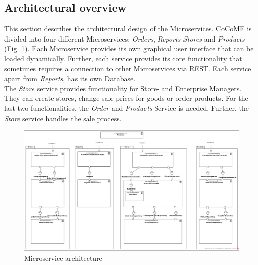 	\FloatBarrier
	\subsection{Architectural overview}	\label{archiOverviewMicro}	
	This section describes the architectural design of the Microservices. CoCoME is divided into four different Microservices: \textit{Orders}, \textit{Reports} \textit{Stores} and \textit{Products} (Fig. \ref{MS_ARch}). Each Microservice provides its own graphical user interface that can be loaded dynamically. Further, each service provides its core functionality that sometimes requires a connection to other Microservices via REST. Each service apart  from \textit{Reports}, has its own Database. \\
	The \textit{Store} service provides functionality for Store- and Enterprise Managers. They can create stores, change sale prices for goods or order products. For the last two functionalities, the \textit{Order} and \textit{Products} Service is needed. Further, the \textit{Store} service handles the sale process. 
	


	
	
	\begin{figure}
	   	\includegraphics[width=\textwidth]{img/MicroserviceArchitecture.jpg}
	   	\caption{Microservice architecture}
	   	\label{MS_ARch}
	\end{figure}
